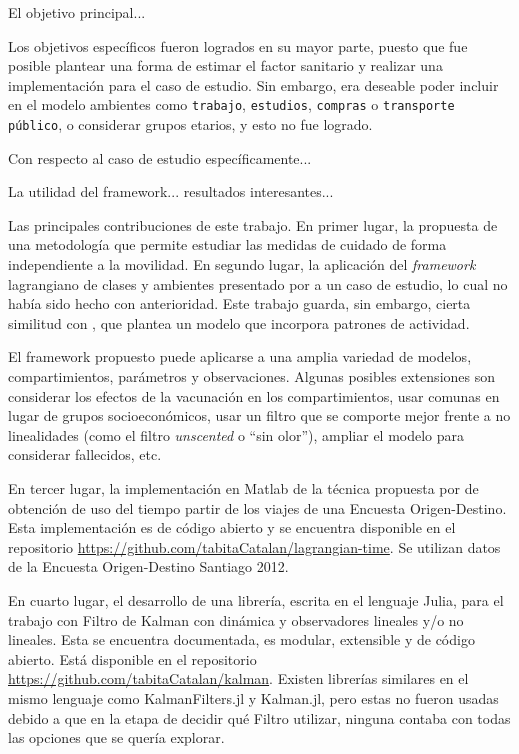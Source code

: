 \begin{conclusion} \label{chap:conclu}


El objetivo principal... 

Los objetivos específicos fueron logrados en su mayor parte, puesto que fue posible plantear una forma de estimar el factor sanitario y realizar una implementación para el caso de estudio. Sin embargo, era deseable poder incluir en el modelo ambientes como \texttt{trabajo}, \texttt{estudios}, \texttt{compras} o \texttt{transporte público}, o considerar grupos etarios, y esto no fue logrado. 

Con respecto al caso de estudio específicamente...

La utilidad del framework... resultados interesantes...

Las principales contribuciones de este trabajo. En primer lugar, la propuesta de una metodología que permite estudiar las medidas de cuidado de forma independiente a la movilidad. En segundo lugar, la aplicación del \textit{framework} lagrangiano de clases y ambientes presentado por \cite{Bichara2018} a un caso de estudio, lo cual no había sido hecho con anterioridad. Este trabajo guarda, sin embargo, cierta similitud con \cite{Shikhmurzaev}, que plantea un modelo que incorpora patrones de actividad.

El framework propuesto puede aplicarse a una amplia variedad de modelos, compartimientos, parámetros y observaciones. Algunas posibles extensiones son considerar los efectos de la vacunación en los compartimientos, usar comunas en lugar de grupos socioeconómicos, usar un filtro que se comporte mejor frente a no linealidades (como el filtro \textit{unscented} o ``sin olor''), ampliar el modelo para considerar fallecidos, etc.


En tercer lugar, la implementación en Matlab de la técnica propuesta por \cite{Munizaga2011} de obtención de uso del tiempo partir de los viajes de una Encuesta Origen-Destino. Esta implementación es de código abierto y se encuentra disponible en el repositorio \url{https://github.com/tabitaCatalan/lagrangian-time}. Se utilizan datos de la Encuesta Origen-Destino Santiago 2012.

En cuarto lugar, el desarrollo de una librería, escrita en el lenguaje Julia, para el trabajo con Filtro de Kalman con dinámica y observadores lineales y/o no lineales. Esta se encuentra documentada, es modular, extensible y de código abierto. Está disponible en el repositorio \url{https://github.com/tabitaCatalan/kalman}. Existen librerías similares en el mismo lenguaje como KalmanFilters.jl y Kalman.jl, pero estas no fueron usadas debido a que en la etapa de decidir qué Filtro utilizar, ninguna contaba con todas las opciones que se quería explorar. 


\end{conclusion}
